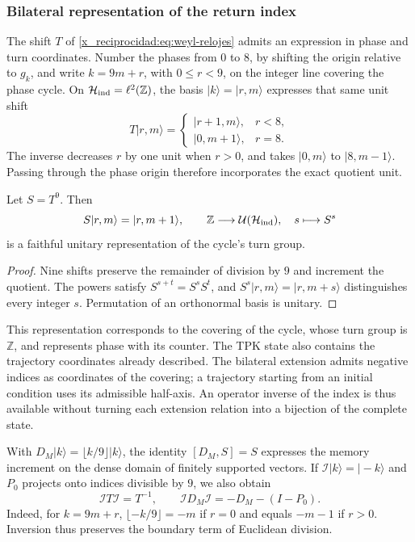 \subsubsection{Bilateral representation of the return index}

The shift \(T\) of \eqref{x_reciprocidad:eq:weyl-relojes} admits an
expression in phase and turn coordinates. Number the phases from \(0\) to
\(8\), by shifting the origin relative to \(g_k\), and
write \(k=9m+r\), with \(0\leq r<9\), on the integer line
covering the phase cycle. On
\(\mathcal H_{\rm ind}=\ell^2(\mathbb Z)\), the basis
\(|k\rangle=|r,m\rangle\) expresses that same unit shift
\[
 T|r,m\rangle=
 \begin{cases}
 |r+1,m\rangle,&r<8,\\
 |0,m+1\rangle,&r=8.
 \end{cases}
\]
The inverse decreases \(r\) by one unit when \(r>0\), and takes
\(|0,m\rangle\) to \(|8,m-1\rangle\). Passing through the phase origin
therefore incorporates the exact quotient unit.

\begin{proposition}
\label{x_reciprocidad:mono-ampl:representacion}
Let \(S=T^9\). Then
\[
 S|r,m\rangle=|r,m+1\rangle,\qquad
 \mathbb Z\longrightarrow\mathcal U(\mathcal H_{\rm ind}),
 \quad s\longmapsto S^s
\]
is a faithful unitary representation of the cycle's turn group.
\end{proposition}
\begin{proof}
Nine shifts preserve the remainder of division by \(9\) and
increment the quotient. The powers satisfy
\(S^{s+t}=S^sS^t\), and \(S^s|r,m\rangle=|r,m+s\rangle\) distinguishes
every integer \(s\). Permutation of an orthonormal basis is unitary.
\end{proof}

This representation corresponds to the covering of the cycle, whose turn
group is \(\mathbb Z\), and represents phase with its counter. The
TPK state also contains the trajectory coordinates already described.
The bilateral extension admits negative indices as coordinates of the
covering; a trajectory starting from an initial condition uses
its admissible half-axis. An operator inverse of the index is thus
available without turning each extension relation into a bijection of the
complete state.

With \(D_M|k\rangle=\lfloor k/9\rfloor|k\rangle\), the identity
\([D_M,S]=S\) expresses the memory increment on the dense domain of
finitely supported vectors. If \(\mathcal I|k\rangle=|-k\rangle\) and
\(P_0\) projects onto indices divisible by \(9\), we also
obtain
\begin{equation}
 \mathcal I T\mathcal I=T^{-1},\qquad
 \mathcal I D_M\mathcal I=-D_M-(I-P_0).
 \label{x_reciprocidad:mono-ampl:inversion-contador}
\end{equation}
Indeed, for \(k=9m+r\),
\(\lfloor-k/9\rfloor=-m\) if \(r=0\) and equals \(-m-1\) if \(r>0\).
Inversion thus preserves the boundary term of Euclidean division.

